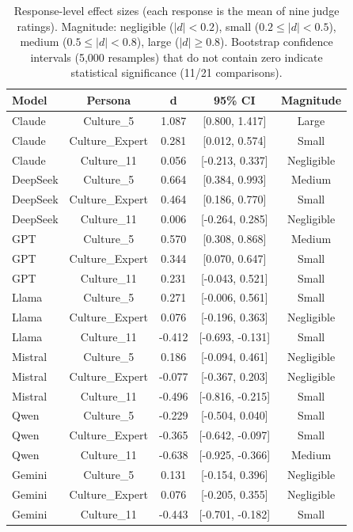\documentclass{article}
\begin{document}
\begin{table}[H]
\centering
\caption{Complete Cohen's d Effect Sizes for Novelty with 95\% Bootstrap CIs}
\label{tab:effects_complete}
\begin{tabular}{lcccc}
\toprule
Model & Persona & d & 95\% CI & Magnitude \\
\midrule
Claude & Culture\_5 & 1.087 & [0.800, 1.417] & Large \\
Claude & Culture\_Expert & 0.281 & [0.012, 0.574] & Small \\
Claude & Culture\_11 & 0.056 & [-0.213, 0.337] & Negligible \\
DeepSeek & Culture\_5 & 0.664 & [0.384, 0.993] & Medium \\
DeepSeek & Culture\_Expert & 0.464 & [0.186, 0.770] & Small \\
DeepSeek & Culture\_11 & 0.006 & [-0.264, 0.285] & Negligible \\
GPT & Culture\_5 & 0.570 & [0.308, 0.868] & Medium \\
GPT & Culture\_Expert & 0.344 & [0.070, 0.647] & Small \\
GPT & Culture\_11 & 0.231 & [-0.043, 0.521] & Small \\
Llama & Culture\_5 & 0.271 & [-0.006, 0.561] & Small \\
Llama & Culture\_Expert & 0.076 & [-0.196, 0.363] & Negligible \\
Llama & Culture\_11 & -0.412 & [-0.693, -0.131] & Small \\
Mistral & Culture\_5 & 0.186 & [-0.094, 0.461] & Negligible \\
Mistral & Culture\_Expert & -0.077 & [-0.367, 0.203] & Negligible \\
Mistral & Culture\_11 & -0.496 & [-0.816, -0.215] & Small \\
Qwen & Culture\_5 & -0.229 & [-0.504, 0.040] & Small \\
Qwen & Culture\_Expert & -0.365 & [-0.642, -0.097] & Small \\
Qwen & Culture\_11 & -0.638 & [-0.925, -0.366] & Medium \\
Gemini & Culture\_5 & 0.131 & [-0.154, 0.396] & Negligible \\
Gemini & Culture\_Expert & 0.076 & [-0.205, 0.355] & Negligible \\
Gemini & Culture\_11 & -0.443 & [-0.701, -0.182] & Small \\
\bottomrule
\end{tabular}
\caption*{\footnotesize Response-level effect sizes (each response is the mean of nine judge ratings). Magnitude: negligible ($|d| < 0.2$), small ($0.2 \le |d| < 0.5$), medium ($0.5 \le |d| < 0.8$), large ($|d| \ge 0.8$). Bootstrap confidence intervals (5,000 resamples) that do not contain zero indicate statistical significance (11/21 comparisons).}
\end{table}
\end{document}
